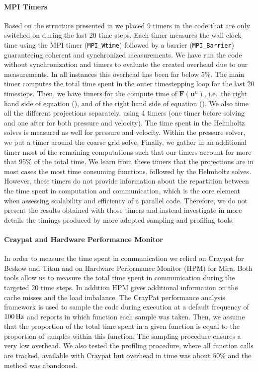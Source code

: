 \documentclass{sig-alternate}
\begin{document}
\paragraph{MPI Timers}
Based on the structure presented in  we placed 9 timers in the code that are
only switched on during the last 20 time steps. Each timer measures the wall
clock time using the MPI timer ({\tt MPI\_Wtime}) followed by a barrier
({\tt MPI\_Barrier}) guaranteeing coherent and synchronized measurements. We
have run the code without synchronization and timers to evaluate the created
overhead due to our measurements. In all instances this overhead has been far
below 5\%. The main timer computes the total time spent in the outer timestepping loop for the last 20 timesteps. Then, we have timers for the compute time of $\mathbf{F} \left( \mathbf{u}^{n} \right)$, i.e.\ the right hand side of equation (), and of the right hand side of equation (). We also time all the different projections separately, using 4 timers (one timer before solving and one after for both pressure and velocity). The time spent in the Helmholtz solves is measured as well for pressure and velocity. Within the pressure solver, we put a timer around the coarse grid solve. Finally, we gather in an additional timer most of the remaining computations such that our timers account for more that 95\% of the total time. We learn from these timers that the projections are in most cases the most time consuming functions, followed by the Helmholtz solves. However, these timers do not provide information about the repartition between the time spent in computation and communication, which is the core element when assessing scalability and efficiency of a parallel code. Therefore, we do not present the results obtained with those timers and instead investigate in more details the timings produced by more adapted sampling and profiling tools.
\paragraph{Craypat and Hardware Performance Monitor}
In order to measure the time spent in communication we relied on Craypat for
Beskow and Titan and on Hardware Performance Monitor (HPM) for Mira. Both tools
allow us to measure the total time spent in communication during the targeted 20 time
steps. In addition HPM gives additional information on the cache misses and the load
imbalance. The CrayPat performance analysis framework is used to sample the code during execution at a default frequency of $\unit[100]{Hz}$ and reports in which function each sample was taken. Then, we assume that the proportion of the total time spent in a given function is equal to the proportion of samples within this function. The sampling procedure ensures a very low overhead. We also tested the profiling procedure, where all function calls are tracked, available with Craypat but overhead in time was about $50\%$ and the method was abandoned.
\end{document}
